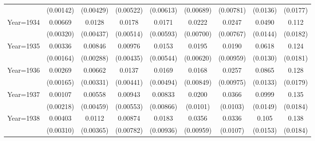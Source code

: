 \begin{table}[htbp]
\begin{tabular}{l*{8}{c}}
                    &   (0.00142)         &   (0.00429)         &   (0.00522)         &   (0.00613)         &   (0.00689)         &   (0.00781)         &    (0.0136)         &    (0.0177)         \\
[1em]
Year=1934           &     0.00669\sym{**} &      0.0128\sym{***}&      0.0178\sym{***}&      0.0171\sym{***}&      0.0222\sym{***}&      0.0247\sym{***}&      0.0490\sym{***}&       0.112\sym{***}\\
                    &   (0.00320)         &   (0.00437)         &   (0.00514)         &   (0.00593)         &   (0.00700)         &   (0.00767)         &    (0.0144)         &    (0.0182)         \\
[1em]
Year=1935           &     0.00336\sym{**} &     0.00846\sym{***}&     0.00976\sym{**} &      0.0153\sym{***}&      0.0195\sym{***}&      0.0190\sym{**} &      0.0618\sym{***}&       0.124\sym{***}\\
                    &   (0.00164)         &   (0.00288)         &   (0.00435)         &   (0.00544)         &   (0.00620)         &   (0.00959)         &    (0.0130)         &    (0.0181)         \\
[1em]
Year=1936           &     0.00269         &     0.00662\sym{**} &      0.0137\sym{***}&      0.0169\sym{***}&      0.0168\sym{**} &      0.0257\sym{***}&      0.0865\sym{***}&       0.128\sym{***}\\
                    &   (0.00165)         &   (0.00331)         &   (0.00441)         &   (0.00494)         &   (0.00849)         &   (0.00975)         &    (0.0133)         &    (0.0179)         \\
[1em]
Year=1937           &     0.00107         &     0.00558         &     0.00943\sym{*}  &     0.00833         &      0.0200\sym{**} &      0.0366\sym{***}&      0.0999\sym{***}&       0.135\sym{***}\\
                    &   (0.00218)         &   (0.00459)         &   (0.00553)         &   (0.00866)         &    (0.0101)         &    (0.0103)         &    (0.0149)         &    (0.0184)         \\
[1em]
Year=1938           &     0.00403         &      0.0112\sym{***}&     0.00874         &      0.0183\sym{*}  &      0.0356\sym{***}&      0.0336\sym{***}&       0.105\sym{***}&       0.138\sym{***}\\
                    &   (0.00310)         &   (0.00365)         &   (0.00782)         &   (0.00936)         &   (0.00959)         &    (0.0107)         &    (0.0153)         &    (0.0184)         \\

\end{tabular}
\end{table}
